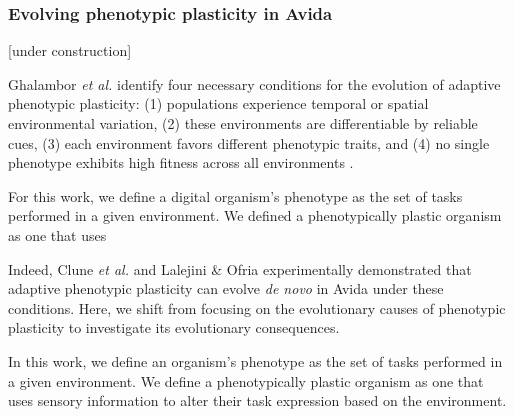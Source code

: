 \subsubsection{Evolving phenotypic plasticity in Avida}
\label{sec:methods:evolution-of-plasticity-in-avida}

[under construction]

Ghalambor \textit{et al.} identify four necessary conditions for the evolution of adaptive phenotypic plasticity: 
(1) populations experience temporal or spatial environmental variation,
(2) these environments are differentiable by reliable cues,
(3) each environment favors different phenotypic traits,
and (4) no single phenotype exhibits high fitness across all environments \citep{ghalambor_behavior_2010}.

For this work, we define a digital organism's phenotype as the set of tasks performed in a given environment.
We defined a phenotypically plastic organism as one that uses 

Indeed, Clune \textit{et al.} \citep{clune_investigating_2007} and Lalejini \& Ofria \citep{lalejini_evolutionary_2016} experimentally demonstrated that adaptive phenotypic plasticity can evolve \textit{de novo} in Avida under these conditions.
Here, we shift from focusing on the evolutionary causes of phenotypic plasticity to investigate its evolutionary consequences.


In this work, we define an organism's phenotype as the set of tasks performed in a given environment.
We define a phenotypically plastic organism as one that uses sensory information to alter their task expression based on the environment.


